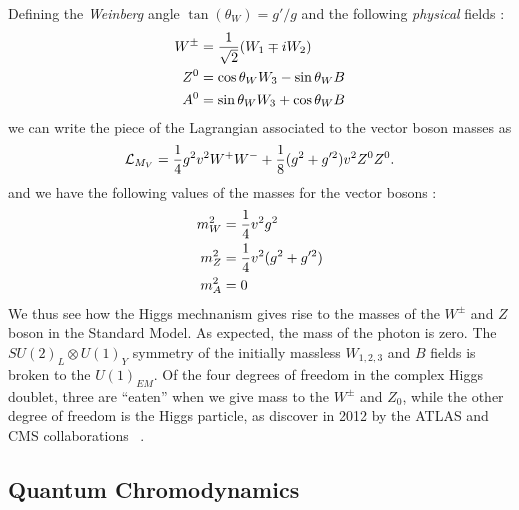 Defining the \textit{Weinberg} angle $\tan(\theta_W) = g'/g$ and the following \textit{physical} fields :
\begin{align}
W^{\pm} &= \frac{1}{\sqrt{2}}(W_1 \mp iW_2) \\
Z^0 &= \cos \theta_W W_3 - \sin\theta_W B \notag\\
A^0 &= \sin \theta_W W_3 + \cos\theta_W B \notag
\end{align}
we can write the piece of the Lagrangian associated to the vector boson masses as
\begin{equation}
\mathcal{L}_{M_V} = \frac{1}{4} g^2 v^2 W^+ W^- + \frac{1}{8} (g^2 + g'^2)v^2 Z^0 Z^0 .
\end{equation}
and we have the following values of the masses for the vector bosons :
\begin{align}
m_W^2 &= \frac{1}{4}  v^2 g^2  \\
m_Z^2 &= \frac{1}{4}  v^2 (g^2 + g'^2)  \notag \\
m_A^2 &= 0  \notag
\end{align}
We thus see how the Higgs mechnanism gives rise to the masses of the $W^{\pm}$ and $Z$ boson in the Standard Model.
As expected, the mass of the photon is zero.
The $SU(2)_L \otimes U(1)_Y$ symmetry of the initially massless $W_{1,2,3}$ and $B$ fields is broken to the $U(1)_{EM}$.
Of the four degrees of freedom in the complex Higgs doublet, three are ``eaten'' when we give mass to the $W^\pm$ and $Z_0$, while the other degree of freedom is the Higgs particle, as discover in 2012 by the ATLAS and CMS collaborations ~\cite{HIGG-2012-27, CMS-HIG-12-028}.

\subsection{Quantum Chromodynamics}

